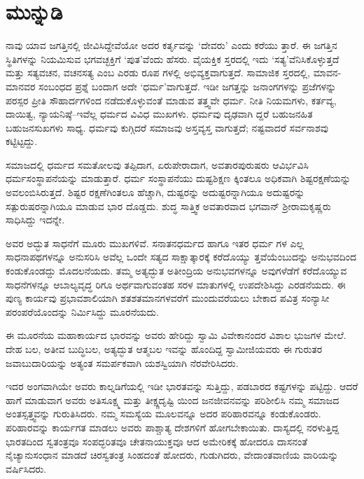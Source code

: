 
\chapter{ಮುನ್ನುಡಿ}

\noindent

ನಾವು ಯಾವ ಜಗತ್ತಿನಲ್ಲಿ ಜೀವಿಸಿದ್ದೇವೆಯೋ ಅದರ ಕರ್ತೃವನ್ನು ‘ದೇವರು’ ಎಂದು ಕರೆಯು ತ್ತಾರೆ. ಈ ಜಗತ್ತಿನ ಸ್ಥಿತಿಗಳನ್ನು ನಿಯಮಿಸುವ ಭಗವಚ್ಛಕ್ತಿಗೆ ‘ಪುತ’ವೆಂದು ಹೆಸರು. ವೈಯಕ್ತಿಕ ಸ್ತರದಲ್ಲಿ ಇದು ‘ಸತ್ಯ’ವೆನಿಸಿಕೊಳ್ಳುತ್ತದೆ ಮತ್ತು ಸತ್ಯವಚನ, ವಚನಸತ್ಯ ಎಂಬ ಎರಡು ರೂಪ ಗಳಲ್ಲಿ ಅಭಿವ್ಯಕ್ತವಾಗುತ್ತದೆ. ಸಾಮಾಜಿಕ ಸ್ತರದಲ್ಲಿ, ಮಾವನ-ಮಾನವರ ಸಂಬಂಧದ ಪ್ರಶ್ನೆ ಬಂದಾಗ ಅದೇ ‘ಧರ್ಮ’ವಾಗುತ್ತದೆ. ಇಡೀ ಜಗತ್ತನ್ನು ಜನಾಂಗಗಳನ್ನು ಪ್ರಜೆಗಳನ್ನು ಪರಸ್ಪರ ಪ್ರೀತಿ ಸೌಹಾರ್ದಗಳಿಂದ ನಡೆದುಕೊಳ್ಳುವಂತೆ ಮಾಡುವ ತತ್ತ್ವವೇ ಧರ್ಮ. ನೀತಿ ನಿಯಮಗಳು, ಕರ್ತವ್ಯ, ದಾಯಿತ್ವ, ನ್ಯಾಯನಿಷ್ಠೆ–ಇವೆಲ್ಲ ಧರ್ಮದ ವಿವಿಧ ಮುಖಗಳು. ಧರ್ಮವು ದೃಢವಾಗಿ ದ್ದರೆ ಬಹುಜನಹಿತ ಬಹುಜನಸುಖಗಳು ಸಾಧ್ಯ. ಧರ್ಮವು ಕುಗ್ಗಿದರೆ ಸಮಾಜವು ಅಸ್ತವ್ಯಸ್ತ ವಾಗುತ್ತದೆ; ನಷ್ಟವಾದರೆ ಸರ್ವನಾಶವು ಕಟ್ಟಿಟ್ಟದ್ದು.

ಸಮಾಜದಲ್ಲಿ ಧರ್ಮದ ಸಮತೋಲವು ತಪ್ಪಿದಾಗ, ಏರುಪೇರಾದಾಗ, ಅವತಾರಪುರುಷರು ಆವಿರ್ಭವಿಸಿ ಧರ್ಮಸಂಸ್ಥಾಪನೆಯನ್ನು ಮಾಡುತ್ತಾರೆ. ಧರ್ಮ ಸಂಸ್ಥಾಪನೆಯು ದುಷ್ಟಶಿಕ್ಷಣ ಕ್ಕಿಂತಲೂ ಅಧಿಕವಾಗಿ ಶಿಷ್ಟರಕ್ಷಣೆಯನ್ನು ಅವಲಂಬಿಸಿರುತ್ತದೆ. ಶಿಷ್ಟರ ರಕ್ಷಣೆಗಿಂತಲೂ ಹೆಚ್ಚಾಗಿ, ದುಷ್ಟರನ್ನು ಅದುಷ್ಟರನ್ನಾಗಿಯೂ ಅದುಷ್ಟರನ್ನು ಸತ್ಪುರುಷರನ್ನಾಗಿಯೂ ಮಾಡುವ ಭಾರ ದೊಡ್ಡದು. ಶುದ್ಧ ಸಾತ್ತ್ವಿಕ ಅವತಾರವಾದ ಭಗವಾನ್ ಶ್ರೀರಾಮಕೃಷ್ಣರು ಸಾಧಿಸಿದ್ದು ಇದನ್ನೇ.

ಅವರ ಅದ್ಭುತ ಸಾಧನೆಗೆ ಮೂರು ಮುಖಗಳಿವೆ. ಸನಾತನಧರ್ಮದ ಹಾಗೂ ಇತರ ಧರ್ಮ ಗಳ ಎಲ್ಲ ಸಾಧನಾಪಥಗಳನ್ನೂ ಅನುಸರಿಸಿ ಅವೆಲ್ಲ ಒಂದೇ ಸತ್ಯದ ಸಾಕ್ಷಾತ್ಕಾರಕ್ಕೆ ಕರೆದೊಯ್ಯು ತ್ತವೆಯೆಂಬುದನ್ನು ಅನುಭವದಿಂದ ಕಂಡುಕೊಂಡದ್ದು ಮೊದಲನೆಯದು. ತಮ್ಮ ಅತ್ಯದ್ಭುತ ಅತೀಂದ್ರಿಯ ಅನುಭವಗಳನ್ನೂ ಅವುಗಳೆಡೆಗೆ ಕರೆದೊಯ್ಯುವ ಸಾಧನೆಗಳನ್ನೂ ಆಬಾಲ್ಯವೃದ್ಧ ರಿಗೂ ಅರ್ಥವಾಗುವಂತಹ ಸರಳ ಮಾತುಗಳಲ್ಲಿ ಉಪದೇಶಿಸಿದ್ದು ಎರಡನೆಯದು. ಈ ಪುಣ್ಯ ಕಾರ್ಯವು ಪ್ರಭಾವಶಾಲಿಯಾಗಿ ಶತಶತಮಾನಗಳವರೆಗೆ ಮುಂದುವರೆಯಲು ಬೇಕಾದ ಪವಿತ್ರ ಸಂನ್ಯಾಸೀ ಪರಂಪರೆಯೊಂದನ್ನು ನಿರ್ಮಿಸಿದ್ದು ಮೂರನೆಯದು.

ಈ ಮೂರನೆಯ ಮಹಾಕಾರ್ಯದ ಭಾರವನ್ನು ಅವರು ಹೇರಿದ್ದು ಸ್ವಾಮಿ ವಿವೇಕಾನಂದರ ವಿಶಾಲ ಭುಜಗಳ ಮೇಲೆ. ದೇಹ ಬಲ, ಅತೀವ ಬುದ್ಧಿಬಲ, ಅತ್ಯದ್ಭುತ ಆತ್ಮಬಲ ಇವನ್ನು ಹೊಂದಿದ್ದ ಸ್ವಾಮೀಜಿಯವರು ಈ ಗುರುತರ ಜವಾಬುದಾರಿಯನ್ನು ಅತ್ಯಂತ ಸಮರ್ಪಕವಾಗಿ ಯಶಸ್ವಿಯಾಗಿ ನೆರವೇರಿಸಿದರು.

ಇದರ ಅಂಗವಾಗಿಯೇ ಅವರು ಕಾಲ್ನಡಿಗೆಯಲ್ಲಿ ಇಡೀ ಭಾರತವನ್ನು ಸುತ್ತಿದ್ದು, ಪಡಬಾರದ ಕಷ್ಟಗಳನ್ನು ಪಟ್ಟಿದ್ದು. ಆದರೆ ಹಾಗೆ ಮಾಡುವಾಗ ಅವರು ಅತಿಸೂಕ್ಷ್ಮ ಮತ್ತು ತೀಕ್ಷ್ಣದೃಷ್ಟಿ ಯಿಂದ ಜನಜೀವನವನ್ನು ಪರಿಶೀಲಿಸಿ ನಮ್ಮ ಸಮಾಜದ ಅಂತಸ್ಸತ್ತ್ವವನ್ನು ಗುರುತಿಸಿದರು. ನಮ್ಮ ಸಮಸ್ಯೆಯ ಮೂಲವನ್ನೂ ಅದರ ಪರಿಹಾರವನ್ನೂ ಕಂಡುಕೊಂಡರು. ಪರಿಹಾರವನ್ನು ಕಾರ್ಯಗತ ಮಾಡಲು ಅವರು ಪಾಶ್ಚಾತ್ಯ ದೇಶಗಳಿಗೆ ಹೋಗಬೇಕಾಯಿತು. ದಾಸ್ಯದಲ್ಲಿ ನರಳುತ್ತಿದ್ದ ಭಾರತದಿಂದ ಸ್ವತಂತ್ರವೂ ಸಂಪದ್ಭರಿತವೂ ಚೇತನಾಯುಕ್ತವೂ ಆದ ಅಮೇರಿಕಕ್ಕೆ ಹೋದರೂ ದಾಸನಂತೆ ನೈಚ್ಯಾನುಸಂಧಾನ ಮಾಡದೆ ಚಿರಸ್ವತಂತ್ರ ಸಿಂಹದಂತೆ ಹೋದರು, ಗುಡುಗಿದರು, ವೇದಾಂತವಾಣಿಯ ವಾರಿಯನ್ನು ವರ್ಷಿಸಿದರು.

